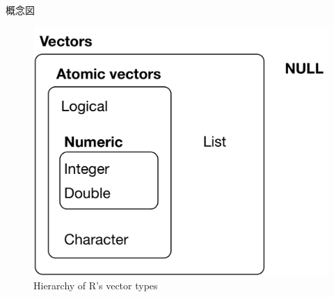 \documentclass[ignorenonframetext,]{beamer}
\begin{document}
\begin{frame}{概念図}

\begin{figure}
\centering
\includegraphics{../img/data-structures-overview.png}
\caption{Hierarchy of R's vector types}
\end{figure}

\end{frame}
\end{document}
